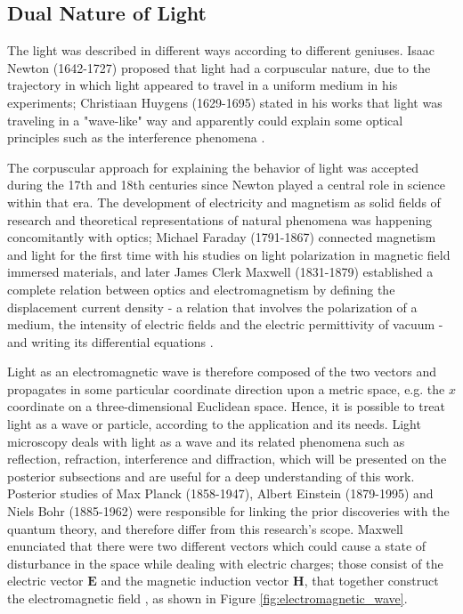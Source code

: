 \subsection{Dual Nature of Light}

The light was described in different ways according to different geniuses. Isaac Newton (1642-1727) proposed that light had a corpuscular nature, due to the trajectory in which light appeared to travel in a uniform medium in his experiments; Christiaan Huygens (1629-1695) stated in his works that light was traveling in a "wave-like" way and apparently could explain some optical principles such as the interference phenomena \cite{fowles1989introduction}. 

The corpuscular approach for explaining the behavior of light was accepted during the 17th and 18th centuries since Newton played a central role in science within that era. The development of electricity and magnetism as solid fields of research and theoretical representations of natural phenomena was happening concomitantly with optics; Michael Faraday (1791-1867) connected magnetism and light for the first time with his studies on light polarization in magnetic field immersed materials, and later James Clerk Maxwell (1831-1879) established a complete relation between optics and electromagnetism by defining the displacement current density - a relation that involves the polarization of a medium, the intensity of electric fields and the electric permittivity of vacuum - and writing its differential equations \cite{zilio2009optica}.

Light as an electromagnetic wave is therefore composed of the two vectors and propagates in some particular coordinate direction upon a metric space, e.g. the $\mathit{x}$ coordinate on a three-dimensional Euclidean space. Hence, it is possible to treat light as a wave or particle, according to the application and its needs. Light microscopy deals with light as a wave and its related phenomena such as reflection, refraction, interference and diffraction, which will be presented on the posterior subsections and are useful for a deep understanding of this work. Posterior studies of Max Planck (1858-1947), Albert Einstein (1879-1995) and Niels Bohr (1885-1962) \cite{fowles1989introduction} were responsible for linking the prior discoveries with the quantum theory, and therefore differ from this research's scope. Maxwell enunciated that there were two different vectors which could cause a state of disturbance in the space while dealing with electric charges; those consist of the electric vector $\mathit{\mathbf{E}}$ and the magnetic induction vector $\mathit{\mathbf{H}}$, that together construct the electromagnetic field \cite{born1999principles}, as shown in Figure \ref{fig:electromagnetic_wave}.

